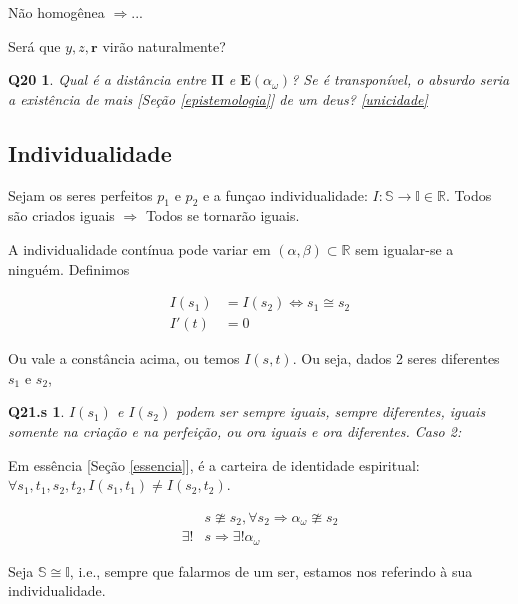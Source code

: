 \documentclass[12pt,a4paper]{article}
\begin{document}
			N\~ao homog\^enea $\Rightarrow$...

			Ser\'a que $y,z, \mathbf{r}$ vir\~ao naturalmente?

			\newtheorem{Q20}{Q20}
			\begin{Q20} Qual \'e a dist\^ancia entre $ \mathbf{\Pi} $ e $ \mathbf{E}(\alpha_\omega )$? Se \'e transpon\'ivel, o absurdo seria a exist\^encia de mais [Se\c{c}\~ao \ref{epistemologia}] de um deus? \ref{unicidade}
			\end{Q20}

		\subsection{Individualidade}\label{individuality}
			\begin{flushright}
			\end{flushright}

			Sejam os seres perfeitos $ p_1 $ e $ p_2 $ e a fun\c{c}ao individualidade: $ I: \mathbb{S} \rightarrow \mathbb{I} \in \mathbb{R}$. Todos s\~ao criados iguais $ \Rightarrow $ Todos se tornar\~ao iguais.

			A individualidade cont\'inua pode variar em $(\alpha, \beta) \subset \mathbb{R}$ sem igualar-se a ningu\'em. Definimos

			\begin{align*}
				I(s_1) &= I(s_2) \Leftrightarrow s_1 \cong s_2 \\
				I'(t) &= 0
			\end{align*}

			Ou vale a const\^ancia acima, ou temos $I(s, t)$. Ou seja, dados 2 seres diferentes $s_1$ e $s_2$,

			\newtheorem{Q21.s}{Q21.s}
			\begin{Q21.s} $I(s_1)$ e $I(s_2)$ podem ser sempre iguais, sempre diferentes, iguais somente na cria\c{c}\~ao e na perfei\c{c}\~ao, ou ora iguais e ora diferentes. Caso 2:
			\end{Q21.s}

			Em ess\^encia [Se\c{c}\~ao \ref{essencia}], \'e a carteira de identidade espiritual: $\forall s_1, t_1, s_2, t_2, I(s_1, t_1) \neq I(s_2, t_2)$.

			\begin{align*}
				&s \ncong s_2, \forall s_2 \Rightarrow \alpha_\omega \ncong s_2 \\
				\exists ! &s \Rightarrow \exists ! \alpha_\omega
			\end{align*}

			Seja $ \mathbb{S} \cong \mathbb{I} $, i.e., sempre que falarmos de um ser, estamos nos referindo \`a sua individualidade.
\end{document}
